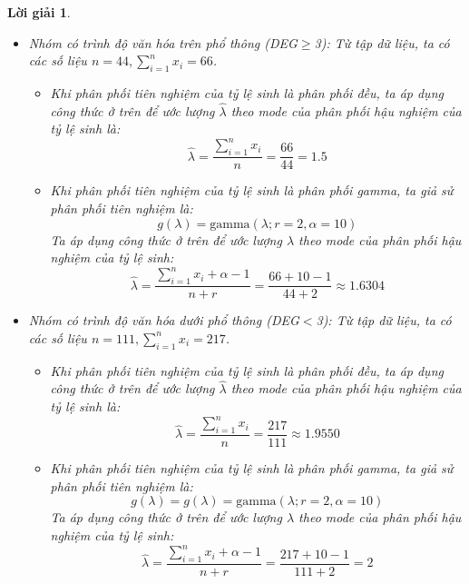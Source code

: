 \documentclass[14pt, a4paper]{article}
\theoremstyle{sltheorem}
\theoremstyle{soltheorem}
\newtheorem*{loigiai}{Lời giải}
\begin{document}
\begin{loigiai}
\begin{enumerate}
        \begin{itemize}
            \item Nhóm có trình độ văn hóa trên phổ thông (DEG$\geq$3):
            Từ tập dữ liệu, ta có các số liệu $n=44, \sum_{i=1}^n x_i=66$.
            \begin{itemize}
                \item Khi phân phối tiên nghiệm của tỷ lệ sinh là phân phối đều, ta áp dụng công thức ở trên để ước lượng $\hat{\lambda}$ theo mode của phân phối hậu nghiệm của tỷ lệ sinh là:
                \begin{equation*}
                    \hat{\lambda} = \dfrac{\sum_{i=1}^n x_i}{n} = \dfrac{66}{44}=1.5
                \end{equation*}
                \item Khi phân phối tiên nghiệm của tỷ lệ sinh là phân phối gamma, ta giả sử phân phối tiên nghiệm là:
                \begin{equation*}
                    g(\lambda) = \text{gamma}(\lambda; r=2, \alpha=10)
                \end{equation*}
                Ta áp dụng công thức ở trên để ước lượng $\hat{\lambda}$ theo mode của phân phối hậu nghiệm của tỷ lệ sinh:
                \begin{equation*}
                    \hat{\lambda} = \dfrac{\sum_{i=1}^n x_i + \alpha - 1}{n + r} = \dfrac{66+10-1}{44 + 2}\approx 1.6304
                \end{equation*}
            \end{itemize}
            \item Nhóm có trình độ văn hóa dưới phổ thông (DEG$<$3):
            Từ tập dữ liệu, ta có các số liệu $n=111, \sum_{i=1}^n x_i=217$.
            \begin{itemize}
                \item Khi phân phối tiên nghiệm của tỷ lệ sinh là phân phối đều, ta áp dụng công thức ở trên để ước lượng $\hat{\lambda}$ theo mode của phân phối hậu nghiệm của tỷ lệ sinh là:
                \begin{equation*}
                    \hat{\lambda} = \dfrac{\sum_{i=1}^n x_i}{n} = \dfrac{217}{111}\approx 1.9550
                \end{equation*}
                \item Khi phân phối tiên nghiệm của tỷ lệ sinh là phân phối gamma, ta giả sử phân phối tiên nghiệm là:
                \begin{equation*}
                    g(\lambda) = g(\lambda) = \text{gamma}(\lambda; r=2, \alpha=10)
                \end{equation*}
                Ta áp dụng công thức ở trên để ước lượng $\hat{\lambda}$ theo mode của phân phối hậu nghiệm của tỷ lệ sinh:
                \begin{equation*}
                    \hat{\lambda} = \dfrac{\sum_{i=1}^n x_i + \alpha - 1}{n + r} = \dfrac{217+10-1}{111 + 2}=2
                \end{equation*}
            \end{itemize}
        \end{itemize}


\end{enumerate}
\end{loigiai}
\end{document}
